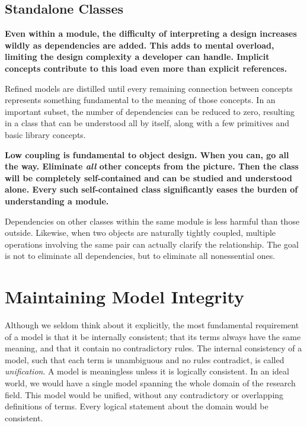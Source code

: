 \documentclass[a4paper,11pt]{article}
\begin{document}
\subsection{Standalone Classes}
\textbf{Even within a module, the difficulty of interpreting a design increases wildly as dependencies are added. This adds to mental overload, limiting the design complexity a developer can handle. Implicit concepts contribute to this load even more than explicit references.}

Refined models are distilled until every remaining connection between concepts represents something fundamental to the meaning of those concepts. In an important subset, the number of dependencies can be reduced to zero, resulting in a class that can be understood all by itself, along with a few primitives and basic library concepts.

\textbf{Low coupling is fundamental to object design. When you can, go all the way. Eliminate \textit{all} other concepts from the picture. Then the class will be completely self-contained and can be studied and understood alone. Every such self-contained class significantly eases the burden of understanding a module.}

Dependencies on other classes within the same module is less harmful than those outside. Likewise, when two objects are naturally tightly coupled, multiple operations involving the same pair can actually clarify the relationship. The goal is not to eliminate all dependencies, but to eliminate all nonessential ones.

\section{Maintaining Model Integrity}
Although we seldom think about it explicitly, the most fundamental requirement of a model is that it be internally consistent; that its terms always have the same meaning, and that it contain no contradictory rules. The internal consistency of a model, such that each term is unambiguous and no rules contradict, is called \textit{unification}. A model is meaningless unless it is logically consistent. In an ideal world, we would have a single model spanning the whole domain of the research field. This model would be unified, without any contradictory or overlapping definitions of terms. Every logical statement about the domain would be consistent. 
\end{document}
